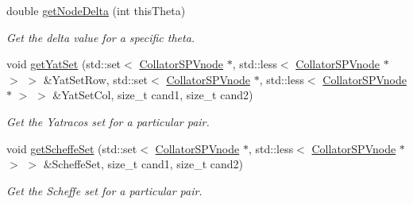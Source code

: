 \begin{DoxyCompactItemize}
double \hyperlink{classsubpavings_1_1CollatorSPVnode_a1ebdb63b747d9c7a477b6ad86d58b714}{get\-Node\-Delta} (int this\-Theta)
\begin{DoxyCompactList}\small\item\em \-Get the delta value for a specific theta. \end{DoxyCompactList}\item 
void \hyperlink{classsubpavings_1_1CollatorSPVnode_ad0bdf61f72d586c8944c076e310b3240}{get\-Yat\-Set} (std\-::set$<$ \hyperlink{classsubpavings_1_1CollatorSPVnode}{\-Collator\-S\-P\-Vnode} $\ast$, std\-::less$<$ \hyperlink{classsubpavings_1_1CollatorSPVnode}{\-Collator\-S\-P\-Vnode} $\ast$ $>$ $>$ \&\-Yat\-Set\-Row, std\-::set$<$ \hyperlink{classsubpavings_1_1CollatorSPVnode}{\-Collator\-S\-P\-Vnode} $\ast$, std\-::less$<$ \hyperlink{classsubpavings_1_1CollatorSPVnode}{\-Collator\-S\-P\-Vnode} $\ast$ $>$ $>$ \&\-Yat\-Set\-Col, size\-\_\-t cand1, size\-\_\-t cand2)
\begin{DoxyCompactList}\small\item\em \-Get the \-Yatracos set for a particular pair. \end{DoxyCompactList}\item 
void \hyperlink{classsubpavings_1_1CollatorSPVnode_a8d430b2bdfb2d8032e5d7f9e9bddb53d}{get\-Scheffe\-Set} (std\-::set$<$ \hyperlink{classsubpavings_1_1CollatorSPVnode}{\-Collator\-S\-P\-Vnode} $\ast$, std\-::less$<$ \hyperlink{classsubpavings_1_1CollatorSPVnode}{\-Collator\-S\-P\-Vnode} $\ast$ $>$ $>$ \&\-Scheffe\-Set, size\-\_\-t cand1, size\-\_\-t cand2)
\begin{DoxyCompactList}\small\item\em \-Get the \-Scheffe set for a particular pair. \end{DoxyCompactList}\end{DoxyCompactItemize}
